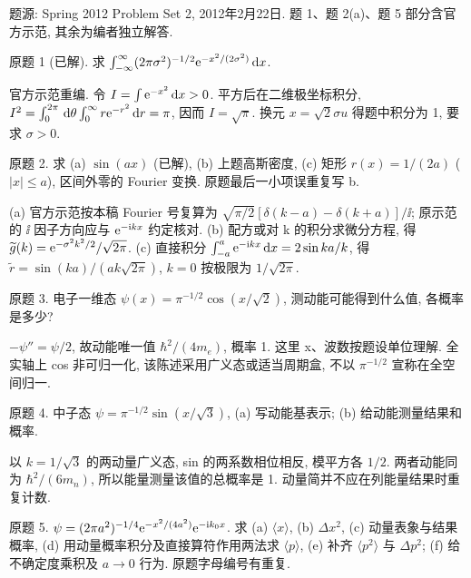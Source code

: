 题源: Spring 2012 Problem Set 2, 2012年2月22日. 题 1、题 2(a)、题 5 部分含官方示范, 其余为编者独立解答.
\begin{exercise}\label{ex:2202-2-1}
原题 1 (已解). 求 $\int_{-\infty}^{\infty}(2\pi\sigma^2)^{-1/2}\mathrm e^{-x^2/(2\sigma^2)}\,\mathrm d x$.
\end{exercise}
\begin{solution}
官方示范重编. 令 $I=\int\mathrm e^{-x^2}\,\mathrm d x>0$. 平方后在二维极坐标积分, $I^2=\int_0^{2\pi}\,\mathrm d\theta\int_0^\infty r\mathrm e^{-r^2}\,\mathrm d r=\pi$, 因而 $I=\sqrt\pi$. 换元 $x=\sqrt2\sigma u$ 得题中积分为 1, 要求 $\sigma>0$.
\end{solution}
\begin{exercise}\label{ex:2202-2-2}
原题 2. 求 (a) $\sin(ax)$ (已解), (b) 上题高斯密度, (c) 矩形 $r(x)=1/(2a)$ ($|x|\le a$), 区间外零的 Fourier 变换. 原题最后一小项误重复写 b.
\end{exercise}
\begin{solution}
(a) 官方示范按本稿 Fourier 号复算为 $\sqrt{\pi/2}[\delta(k-a)-\delta(k+a)]/\ii$; 原示范的 $\ii$ 因子方向应与 $\mathrm e^{-\mathrm i kx}$ 约定核对. (b) 配方或对 k 的积分求微分方程, 得 $\widetilde g(k)=\mathrm e^{-\sigma^2k^2/2}/\sqrt{2\pi}$. (c) 直接积分 $\int_{-a}^a\mathrm e^{-\mathrm i kx}\,\mathrm d x=2\sin ka/k$, 得 $\widetilde r=\sin(ka)/(ak\sqrt{2\pi})$, $k=0$ 按极限为 $1/\sqrt{2\pi}$.
\end{solution}
\begin{exercise}\label{ex:2202-2-3}
原题 3. 电子一维态 $\psi(x)=\pi^{-1/2}\cos(x/\sqrt2)$, 测动能可能得到什么值, 各概率是多少?
\end{exercise}
\begin{solution}
$-\psi''=\psi/2$, 故动能唯一值 $\hbar^2/(4m_e)$, 概率 1. 这里 x、波数按题设单位理解. 全实轴上 cos 非可归一化, 该陈述采用广义态或适当周期盒, 不以 $\pi^{-1/2}$ 宣称在全空间归一.
\end{solution}
\begin{exercise}\label{ex:2202-2-4}
原题 4. 中子态 $\psi=\pi^{-1/2}\sin(x/\sqrt3)$, (a) 写动能基表示; (b) 给动能测量结果和概率.
\end{exercise}
\begin{solution}
以 $k=1/\sqrt3$ 的两动量广义态, sin 的两系数相位相反, 模平方各 $1/2$. 两者动能同为 $\hbar^2/(6m_n)$, 所以能量测量该值的总概率是 1. 动量简并不应在列能量结果时重复计数.
\end{solution}
\begin{exercise}\label{ex:2202-2-5}
原题 5. $\psi=(2\pi a^2)^{-1/4}\mathrm e^{-x^2/(4a^2)}\mathrm e^{-\mathrm i k_0x}$. 求 (a) $\langle x\rangle$, (b) $\Delta x^2$, (c) 动量表象与结果概率, (d) 用动量概率积分及直接算符作用两法求 $\langle p\rangle$, (e) 补齐 $\langle p^2\rangle$ 与 $\Delta p^2$; (f) 给不确定度乘积及 $a\to0$ 行为. 原题字母编号有重复.
\end{exercise}

